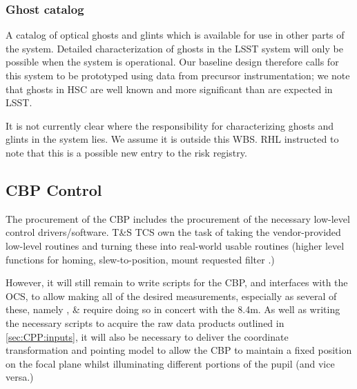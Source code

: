 \subsubsection{Ghost catalog}\label{sec:CPP:output:GhostCatalog}
A catalog of optical ghosts and glints which is available for use in other parts of the system. Detailed characterization of ghosts in the LSST system will only be possible when the system is operational. Our baseline design therefore calls for this system to be prototyped using data from precursor instrumentation; we note that ghosts in \eg HSC are well known and more significant than are expected in LSST.
\begin{note}
It is not currently clear where the responsibility for characterizing ghosts and glints in the system lies. We assume it is outside this WBS. RHL instructed to note that this is a possible new entry to the risk registry.
\end{note}





\subsection{CBP Control}\label{sec:CPP:CBP_control}
The procurement of the CBP includes the procurement of the necessary low-level control drivers/software. T\&S TCS own the task of taking the vendor-provided low-level routines and turning these into real-world usable routines (higher level functions for \eg homing, slew-to-position, mount requested filter \etc.)

However, it will still remain to write scripts for the CBP, and interfaces with the OCS, to allow making all of the desired measurements, especially as several of these, namely \xxx, \xxx \& \xxx require doing so in concert with the 8.4m.
\alg As well as writing the necessary scripts to acquire the raw data products outlined in \secsymbol\ref{sec:CPP:inputs}, it will also be necessary to deliver the coordinate transformation and pointing model to allow the CBP to maintain a fixed position on the focal plane whilst illuminating different portions of the pupil (and vice versa.)


















